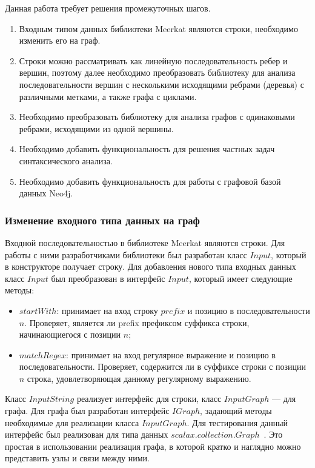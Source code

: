 Данная работа требует решения промежуточных шагов.
\begin{enumerate}
\item Входным типом данных библиотеки Meerkat являются строки, необходимо изменить его на граф.
\item Строки можно рассматривать как линейную последовательность ребер и вершин, поэтому далее необходимо преобразовать библиотеку для анализа последовательности вершин с несколькими исходящими ребрами (деревья) с различными метками, а также графа с циклами.
\item Необходимо преобразовать библиотеку для анализа графов с одинаковыми ребрами, исходящими из одной вершины.
\item Необходимо добавить функциональность для решения частных задач синтаксического анализа.
\item Необходимо добавить функциональность для работы с графовой базой данных Neo4j.
\end{enumerate}

\subsubsection{Изменение входного типа данных на граф}


Входной последовательностью в библиотеке Meerkat являются строки. Для работы с ними разработчиками библиотеки был разработан класс $Input$, который в конструкторе получает строку. Для добавления нового типа входных данных класс $Input$ был преобразован в интерфейс $Input$, который имеет следующие методы:
\begin{itemize}
\item $startWith$: принимает на вход строку $prefix$ и позицию в последовательности $n$. Проверяет, является ли prefix префиксом суффикса строки, начинающиегося с позиции $n$;
\item $matchRegex$: принимает на вход регулярное выражение и позицию в последовательности. Проверяет, содержится ли в суффиксе строки с позиции $n$ строка, удовлетворяющая данному регулярному выражению.
\end{itemize}

Класс $InputString$ реализует интерфейс для строки, класс $InputGraph$ --- для графа. Для графа был разработан интерфейс $IGraph$, задающий методы необходимые для реализации класса $InputGraph$. Для тестирования данный интерфейс был реализован для типа данных $scalax.collection.Graph$~\cite{Graph}. Это простая в использовании реализация графа, в которой кратко и наглядно можно представить узлы и связи между ними.


